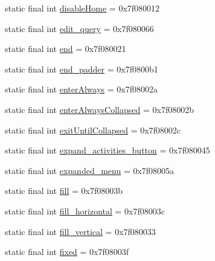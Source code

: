 \begin{CompactItemize}
\item 
static final int \hyperlink{classandroid_1_1support_1_1graphics_1_1drawable_1_1_r_1_1id_d31422df6ddb16b752d57897df677650}{disableHome} = 0x7f080012
\item 
static final int \hyperlink{classandroid_1_1support_1_1graphics_1_1drawable_1_1_r_1_1id_46bb15021b3e23a0dfe5c780664f94ee}{edit\_\-query} = 0x7f080066
\item 
static final int \hyperlink{classandroid_1_1support_1_1graphics_1_1drawable_1_1_r_1_1id_e503a324afa7e91460b95e1c56627296}{end} = 0x7f080021
\item 
static final int \hyperlink{classandroid_1_1support_1_1graphics_1_1drawable_1_1_r_1_1id_110f381da2cf7075f780e6154120d467}{end\_\-padder} = 0x7f0800b1
\item 
static final int \hyperlink{classandroid_1_1support_1_1graphics_1_1drawable_1_1_r_1_1id_5190a188d93cb1aaf594686342b500cb}{enterAlways} = 0x7f08002a
\item 
static final int \hyperlink{classandroid_1_1support_1_1graphics_1_1drawable_1_1_r_1_1id_12ca769121d69f74be7e339c8279a55a}{enterAlwaysCollapsed} = 0x7f08002b
\item 
static final int \hyperlink{classandroid_1_1support_1_1graphics_1_1drawable_1_1_r_1_1id_26ef724ec28286c50aa1ff6a5952c33e}{exitUntilCollapsed} = 0x7f08002c
\item 
static final int \hyperlink{classandroid_1_1support_1_1graphics_1_1drawable_1_1_r_1_1id_53e64ed3c59097eedb86149ca762d110}{expand\_\-activities\_\-button} = 0x7f080045
\item 
static final int \hyperlink{classandroid_1_1support_1_1graphics_1_1drawable_1_1_r_1_1id_3279d15f1de883c020b0bfaaeb9f4b2e}{expanded\_\-menu} = 0x7f08005a
\item 
static final int \hyperlink{classandroid_1_1support_1_1graphics_1_1drawable_1_1_r_1_1id_5c97c00a07a210f84b31ce3688f2ef6f}{fill} = 0x7f08003b
\item 
static final int \hyperlink{classandroid_1_1support_1_1graphics_1_1drawable_1_1_r_1_1id_3d2680b01ec511348004bd106801c94d}{fill\_\-horizontal} = 0x7f08003c
\item 
static final int \hyperlink{classandroid_1_1support_1_1graphics_1_1drawable_1_1_r_1_1id_9df9588ab5ea63cdd3ba4b02b5afc850}{fill\_\-vertical} = 0x7f080033
\item 
static final int \hyperlink{classandroid_1_1support_1_1graphics_1_1drawable_1_1_r_1_1id_39b8322e3c5100639ebbfef8dd03c583}{fixed} = 0x7f08003f
\item 

\end{CompactItemize}
